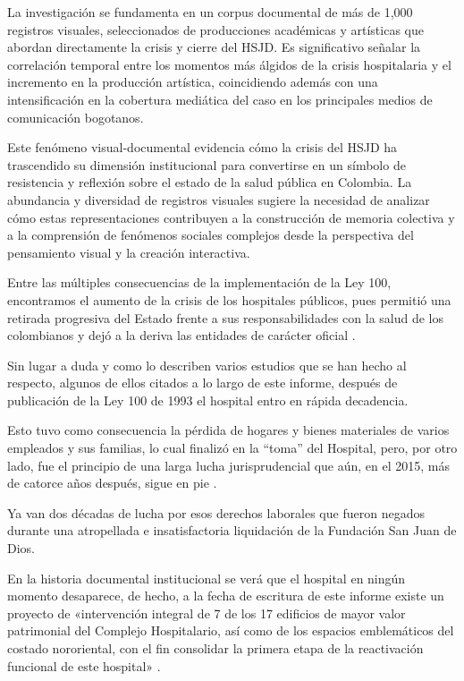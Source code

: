 La investigación se fundamenta en un corpus documental de más de 1,000 registros visuales, seleccionados de producciones académicas y artísticas que abordan directamente la crisis y cierre del HSJD. Es significativo señalar la correlación temporal entre los momentos más álgidos de la crisis hospitalaria y el incremento en la producción artística, coincidiendo además con una intensificación en la cobertura mediática del caso en los principales medios de comunicación bogotanos.

Este fenómeno visual-documental evidencia cómo la crisis del HSJD ha trascendido su dimensión institucional para convertirse en un símbolo de resistencia y reflexión sobre el estado de la salud pública en Colombia. La abundancia y diversidad de registros visuales sugiere la necesidad de analizar cómo estas representaciones contribuyen a la construcción de memoria colectiva y a la comprensión de fenómenos sociales complejos desde la perspectiva del pensamiento visual y la creación interactiva.

Entre las múltiples consecuencias de la implementación de la Ley 100, encontramos el aumento de la crisis de los hospitales públicos, pues permitió una retirada progresiva del Estado frente a sus responsabilidades con la salud de los colombianos y dejó a la deriva las entidades de carácter oficial \parencite{Castiblanco2017}.

Sin lugar a duda y como lo describen varios estudios que se han hecho al respecto, algunos de ellos citados a lo largo de este informe, después de publicación de la Ley 100 de 1993 el hospital entro en rápida decadencia.

Esto tuvo como consecuencia la pérdida de hogares y bienes materiales de varios empleados y sus familias, lo cual finalizó en la “toma” del Hospital, pero, por otro lado, fue el principio de una larga lucha jurisprudencial que aún, en el 2015, más de catorce años después, sigue en pie \parencite{Orlando2015}.

Ya van dos décadas de lucha por esos derechos laborales que fueron negados durante una atropellada e insatisfactoria liquidación de la Fundación San Juan de Dios. 

En la historia documental institucional se verá que el hospital en ningún momento desaparece, de hecho, a la fecha de escritura de este informe existe un proyecto de «intervención integral de 7 de los 17 edificios de mayor valor patrimonial del Complejo Hospitalario, así como de los espacios emblemáticos del costado nororiental, con el fin consolidar la primera etapa de la reactivación funcional de este hospital» .

